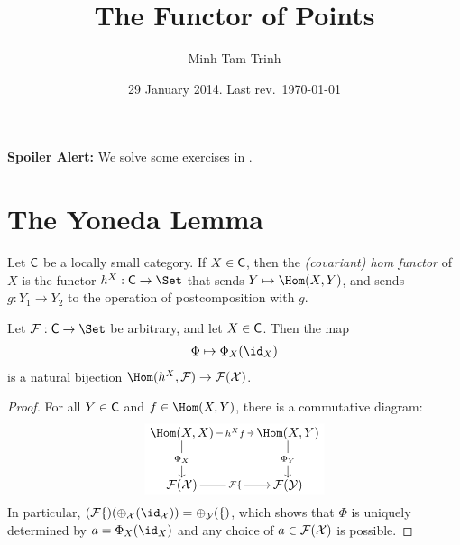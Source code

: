 \documentclass[10pt,oneside,final]{amsart}
\begin{document}

\title{The Functor of Points}
\date{29 January 2014. Last rev.~\today}


\author{Minh-Tam Trinh}
\address{Department of Mathematics, Princeton University, Princeton, NJ 08544}

\maketitle

\thispagestyle{empty}


\textbf{Spoiler Alert:}
We solve some exercises in \cite{EH}.

\section{The Yoneda Lemma}

Let $\sf{C}$ be a locally small category.
If $X \in \sf{C}$, then the \emph{(covariant) hom functor} of $X$ is the functor $h^X : \sf{C} \to \Set$ that sends $Y \mapsto \Hom(X, Y)$, and sends $g : Y_1 \to Y_2$ to the operation of postcomposition with $g$.

\begin{lem}[Yoneda]\label{00}
Let $\cal{F} : \sf{C} \to \Set$ be arbitrary, and let $X \in \sf{C}$.
Then the map
\begin{align}
\Phi \mapsto \Phi_X(\id_X)
\end{align}
is a natural bijection $\Hom(h^X, \cal{F}) \to \cal{F}(X)$.
\end{lem}

\begin{proof}
For all $Y \in \sf{C}$ and $f \in \Hom(X, Y)$, there is a commutative diagram:
\begin{equation}
\begin{tikzpicture}[baseline=(current  bounding  box.center)]
\tikzstyle{every node}=[fill=white,  inner sep=2pt]
\matrix (m)
[	matrix of math nodes,
	row sep 		=	3em,
	column sep 	=	3em,
	text height	=	1.5ex,
	text depth	=	0.25ex
]
{ 		\Hom(X, X) 			&\Hom(X, Y)\\
		\cal{F}(X)				&\cal{F}(Y)		\\
};
\path[->, font=\scriptsize]
(m-1-1) edge node 	{$h^X f$}					(m-1-2)
(m-1-1) edge node	{$\Phi_X$}					(m-2-1)
(m-1-2) edge node	{$\Phi_Y$}					(m-2-2)
(m-2-1) edge node 	{$\cal{F} f$}					(m-2-2);
\end{tikzpicture}
\end{equation}
In particular, $(\cal{F} f)(\Phi_X(\id_X)) = \Phi_Y(f)$, which shows that $\Phi$ is uniquely determined by $a = \Phi_X(\id_X)$ and any choice of $a \in \cal{F}(X)$ is possible.
\end{proof}
\end{document}
